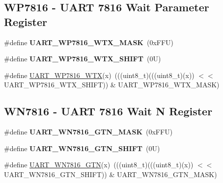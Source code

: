 \subsection*{W\+P7816 -\/ U\+A\+RT 7816 Wait Parameter Register}
\begin{DoxyCompactItemize}
\item 
\mbox{\label{group___u_a_r_t___register___masks_gacc9888c452ec79d9bcc54eb93f7a4b79}} 
\#define {\bfseries U\+A\+R\+T\+\_\+\+W\+P7816\+\_\+\+W\+T\+X\+\_\+\+M\+A\+SK}~(0x\+F\+F\+U)
\item 
\mbox{\label{group___u_a_r_t___register___masks_ga508f290069c91d644708f8a0c16eb700}} 
\#define {\bfseries U\+A\+R\+T\+\_\+\+W\+P7816\+\_\+\+W\+T\+X\+\_\+\+S\+H\+I\+FT}~(0\+U)
\item 
\#define \mbox{\hyperlink{group___u_a_r_t___register___masks_gae574b729c7e8a7f314fb22be9b5ad305}{U\+A\+R\+T\+\_\+\+W\+P7816\+\_\+\+W\+TX}}(x)~(((uint8\+\_\+t)(((uint8\+\_\+t)(x)) $<$$<$ U\+A\+R\+T\+\_\+\+W\+P7816\+\_\+\+W\+T\+X\+\_\+\+S\+H\+I\+FT)) \& U\+A\+R\+T\+\_\+\+W\+P7816\+\_\+\+W\+T\+X\+\_\+\+M\+A\+SK)
\end{DoxyCompactItemize}
\subsection*{W\+N7816 -\/ U\+A\+RT 7816 Wait N Register}
\begin{DoxyCompactItemize}
\item 
\mbox{\label{group___u_a_r_t___register___masks_ga2ca85f017d51ef94ac685ce60d365795}} 
\#define {\bfseries U\+A\+R\+T\+\_\+\+W\+N7816\+\_\+\+G\+T\+N\+\_\+\+M\+A\+SK}~(0x\+F\+F\+U)
\item 
\mbox{\label{group___u_a_r_t___register___masks_gab7deaf09ea769ec9cb28b66bfc90d141}} 
\#define {\bfseries U\+A\+R\+T\+\_\+\+W\+N7816\+\_\+\+G\+T\+N\+\_\+\+S\+H\+I\+FT}~(0\+U)
\item 
\#define \mbox{\hyperlink{group___u_a_r_t___register___masks_gace5f01806058a7519f09ca698a48dedd}{U\+A\+R\+T\+\_\+\+W\+N7816\+\_\+\+G\+TN}}(x)~(((uint8\+\_\+t)(((uint8\+\_\+t)(x)) $<$$<$ U\+A\+R\+T\+\_\+\+W\+N7816\+\_\+\+G\+T\+N\+\_\+\+S\+H\+I\+FT)) \& U\+A\+R\+T\+\_\+\+W\+N7816\+\_\+\+G\+T\+N\+\_\+\+M\+A\+SK)
\end{DoxyCompactItemize}
